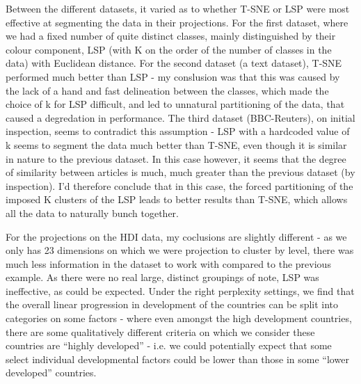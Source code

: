 \documentclass[ 10pt ]{fphw}
\begin{document}
Between the different datasets, it varied as to whether T-SNE or LSP were most effective at segmenting the data in their projections. For the first dataset, where we had a fixed number of quite distinct classes, mainly distinguished by their colour component, LSP (with K on the order of the number of classes in the data) with Euclidean distance. For the second dataset (a text dataset), T-SNE performed much better than LSP - my conslusion was that this was caused by the lack of a hand and fast delineation between the classes, which made the choice of k for LSP difficult, and led to unnatural partitioning of the data, that caused a degredation in performance. The third dataset (BBC-Reuters), on initial inspection, seems to contradict this assumption - LSP with a hardcoded value of k seems to segment the data much better than T-SNE, even though it is similar in nature to the previous dataset. In this case however, it seems that the degree of similarity between articles is much, much greater than the previous dataset (by inspection). I'd therefore conclude that in this case, the forced partitioning of the imposed K clusters of the LSP leads to better results than T-SNE, which allows all the data to naturally bunch together. 

For the projections on the HDI data, my coclusions are slightly different - as we only has 23 dimensions on which we were projection to cluster by level, there was much less information in the dataset to work with compared to the previous example. As there were no real large, distinct groupings of note, LSP was ineffective, as could be expected. Under the right perplexity settings, we find that the overall linear progression in development of the countries can be split into categories on some factors - where even amongst the high development countries, there are some qualitatively different criteria on which we consider these countries are ``highly developed'' - i.e. we could potentially expect that some select individual developmental factors could be lower than those in some ``lower developed'' countries.
\end{document}
